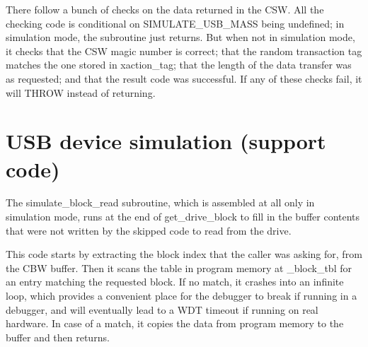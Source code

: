 There follow a bunch of checks on the data returned in the CSW.  All the
checking code is conditional on SIMULATE\_USB\_MASS being undefined; in
simulation mode, the subroutine just returns.  But when not in simulation
mode, it checks that the CSW magic number is correct; that the random
transaction tag matches the one stored in xaction\_tag; that the length of
the data transfer was as requested; and that the result code was successful. 
If any of these checks fail, it will THROW instead of returning.

\section{USB device simulation (support code)}

The simulate\_block\_read subroutine, which is assembled at all only in
simulation mode, runs at the end of get\_drive\_block to fill in the buffer
contents that were not written by the skipped code to read from the drive. 

This code starts by extracting the block index that the caller was asking
for, from the CBW buffer.  Then it scans the table in program memory at
\_block\_tbl for an entry matching the requested block.  If no match, it
crashes into an infinite loop, which provides a convenient place for the
debugger to break if running in a debugger, and will eventually lead to a
WDT timeout if running on real hardware.  In case of a match, it copies the
data from program memory to the buffer and then returns.
